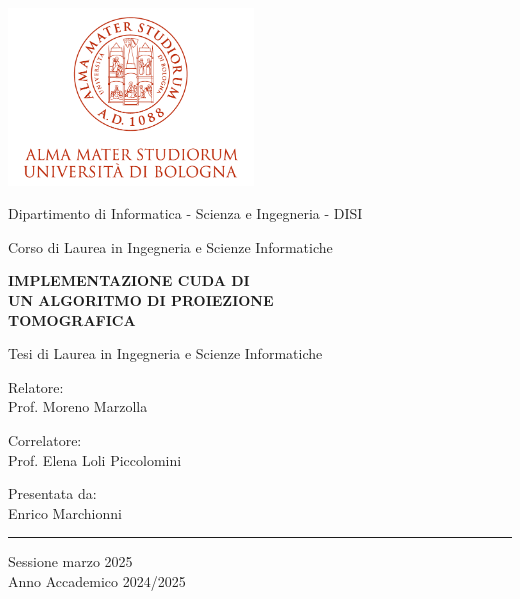 \documentclass[12pt,a4paper]{report}
\begin{document}
\begin{spacing}{1.5}
\begin{titlepage}

\begin{center}

\includegraphics[width=6.5cm,height=4.7cm]{marchio-di-ateneo}

\vspace{4mm}

{Dipartimento di Informatica - Scienza e Ingegneria - DISI}

\vspace{2mm}

{\large{Corso di Laurea in Ingegneria e Scienze Informatiche}}

\vspace{10mm}

{\huge{\bf{IMPLEMENTAZIONE CUDA DI}}}\\
\vspace{3mm}
{\huge{\bf{UN ALGORITMO DI PROIEZIONE}}}\\
\vspace{3mm}
{\huge{\bf{TOMOGRAFICA}}}\\
\vspace{3mm}

\vspace{5mm}
{Tesi di Laurea in Ingegneria e Scienze Informatiche}

\end{center}

\vspace{10mm}

\noindent\begin{minipage}[t]{0.40\textwidth}
{\large{Relatore: \\ Prof. Moreno Marzolla}}

\vspace{3mm}

{\large{Correlatore: \\ Prof. Elena Loli Piccolomini}}
\end{minipage}
\hfill
\begin{minipage}[t]{0.40\textwidth}\raggedleft
{\large{Presentata da: \\ Enrico Marchionni}}
\end{minipage}

\vfill

\hrule height 0.6mm

\begin{center}
{Sessione marzo 2025\\}
{Anno Accademico 2024/2025\\}
\end{center}

\end{titlepage}
\end{spacing}
\end{document}
